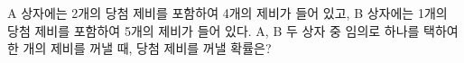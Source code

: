 A 상자에는 2개의 당첨 제비를 포함하여 4개의 제비가 들어 있고, B 상자에는 1개의 당첨 제비를 포함하여 5개의 제비가 들어 있다. A, B 두 상자 중 임의로 하나를 택하여 한 개의 제비를 꺼낼 때, 당첨 제비를 꺼낼 확률은?
